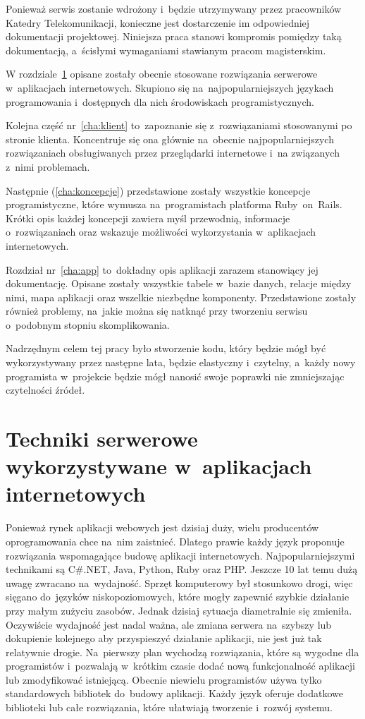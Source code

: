 \documentclass[a4paper,12pt,oneside]{report}
\begin{document}
Ponieważ serwis zostanie wdrożony i~będzie utrzymywany przez pracowników Katedry Telekomunikacji, konieczne jest dostarczenie im odpowiedniej dokumentacji projektowej. Niniejsza praca stanowi kompromis pomiędzy taką dokumentacją, a~ścisłymi wymaganiami stawianym pracom magisterskim. 

W rozdziale~\ref{cha:serwer} opisane zostały obecnie stosowane rozwiązania serwerowe w~aplikacjach internetowych. Skupiono się na~najpopularniejszych językach programowania i~dostępnych dla nich środowiskach programistycznych.

Kolejna część nr~\ref{cha:klient} to~zapoznanie się z~rozwiązaniami stosowanymi po stronie klienta. Koncentruje się ona głównie na~obecnie najpopularniejszych rozwiązaniach obsługiwanych przez przeglądarki internetowe i~na związanych z~nimi problemach.

Następnie (\ref{cha:koncepcje}) przedstawione zostały wszystkie koncepcje programistyczne, które wymusza na~programistach platforma Ruby~on~Rails. Krótki opis każdej koncepcji zawiera myśl przewodnią, informacje o~rozwiązaniach oraz wskazuje możliwości wykorzystania w~aplikacjach internetowych.

Rozdział nr~\ref{cha:app} to~dokładny opis aplikacji zarazem stanowiący jej dokumentację. Opisane zostały wszystkie tabele w~bazie danych, relacje między nimi, mapa aplikacji oraz wszelkie niezbędne komponenty. Przedstawione zostały również problemy, na~jakie można się natknąć przy tworzeniu serwisu o~podobnym stopniu skomplikowania.

Nadrzędnym celem tej pracy było stworzenie kodu, który będzie mógł być wykorzystywany przez następne lata, będzie elastyczny i~czytelny, a~każdy nowy programista w~projekcie będzie mógł nanosić swoje poprawki nie zmniejszając czytelności źródeł. 

\chapter[Techniki po stronie serwera]{Techniki serwerowe wykorzystywane w~aplikacjach internetowych}
\label{cha:serwer}

Ponieważ rynek aplikacji webowych jest dzisiaj duży, wielu producentów oprogramowania chce na~nim zaistnieć. Dlatego prawie każdy język proponuje rozwiązania wspomagające budowę aplikacji internetowych. Najpopularniejszymi technikami są C\#.NET, Java, Python, Ruby oraz PHP. Jeszcze 10 lat temu dużą uwagę zwracano na~wydajność. Sprzęt komputerowy był stosunkowo drogi, więc sięgano do~języków niskopoziomowych, które mogły zapewnić szybkie działanie przy małym zużyciu zasobów. Jednak dzisiaj sytuacja diametralnie się zmieniła. Oczywiście wydajność jest nadal ważna, ale zmiana serwera na~szybszy lub dokupienie kolejnego aby przyspieszyć działanie aplikacji, nie jest już tak relatywnie drogie. Na~pierwszy plan wychodzą rozwiązania, które są wygodne dla programistów i~pozwalają w~krótkim czasie dodać nową funkcjonalność aplikacji lub zmodyfikować istniejącą. Obecnie niewielu programistów używa tylko standardowych bibliotek do~budowy aplikacji. Każdy język oferuje dodatkowe biblioteki lub całe rozwiązania, które ułatwiają tworzenie i~rozwój systemu. 
\end{document}
